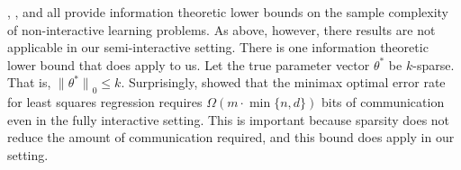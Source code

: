 \documentclass[twoside]{article}
\newcommand{\w}{\theta}
\newcommand{\wstar}{{\w^{*}}}
\newcommand{\lzero}[1]{{\lVert {#1} \rVert}_0}
\begin{document}
\cite{shamir2014fundamental}, \cite{zhang2013information}, and \cite{garg2014communication} all provide information theoretic lower bounds on the sample complexity of non-interactive learning problems.
As above, however, there results are not applicable in our semi-interactive setting.
There is one information theoretic lower bound that does apply to us.
Let the true parameter vector $\wstar$ be $k$-sparse.
That is, $\lzero{\wstar} \le k$.
Surprisingly, \cite{braverman2015communication} showed that the minimax optimal error rate for least squares regression requires $\Omega(m\cdot\min\{n,d\})$ bits of communication even in the fully interactive setting.
This is important because sparsity does not reduce the amount of communication required, and this bound does apply in our setting.

%
%
%




\end{document}
